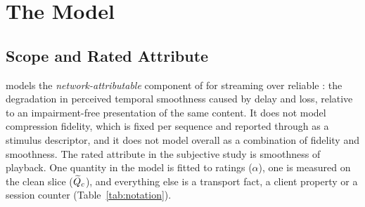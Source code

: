 \section{The \crystal Model}
\label{sec:model}

\subsection{Scope and Rated Attribute}
\label{sec:model-scope}
\crystal models the \emph{network-attributable} component of \qoe for
\vpcc streaming over reliable \quic: the degradation in perceived
temporal smoothness caused by delay and loss, relative to an
impairment-free presentation of the same content. It does not model
compression fidelity, which is fixed per sequence and reported through
\pcqm as a stimulus descriptor, and it does not model overall \mos as a
combination of fidelity and smoothness. The rated attribute in the
subjective study is smoothness of playback. One quantity in the model
is fitted to ratings ($\alpha$), one is measured on the clean slice
($\widetilde{Q}_c$), and everything else is a transport fact, a client property or
a session counter (Table~\ref{tab:notation}).

